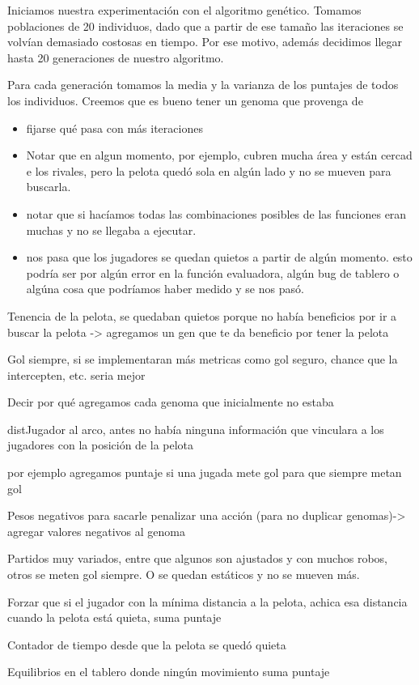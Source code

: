 Iniciamos nuestra experimentación con el algoritmo genético. Tomamos poblaciones de 20 individuos, dado que a partir de ese tamaño las iteraciones se volvían demasiado costosas en tiempo. Por ese motivo, además decidimos llegar hasta 20 generaciones de nuestro algoritmo.

Para cada generación tomamos la media y la varianza de los puntajes de todos los individuos. Creemos que es bueno tener un genoma que provenga de











\begin{itemize}
    \item fijarse qué pasa con más iteraciones
    \item Notar que en algun momento, por ejemplo, cubren mucha área y están cercad e los rivales, pero la pelota quedó sola en algún lado y no se mueven para buscarla.
    \item notar que si hacíamos todas las combinaciones posibles de las funciones eran muchas y no se llegaba a ejecutar.
    \item nos pasa que los jugadores se quedan quietos a partir de algún momento. esto podría ser por algún error en la función evaluadora, algún bug de tablero o algúna cosa que podríamos haber medido y se nos pasó.
\end{itemize}

Tenencia de la pelota, se quedaban quietos porque no había beneficios por ir a buscar la pelota -> agregamos un gen que te da beneficio por tener la pelota

Gol siempre, si se implementaran más metricas como gol seguro, chance que la intercepten, etc. seria mejor

Decir por qué agregamos cada genoma que inicialmente no estaba

distJugador al arco, antes no había ninguna información que vinculara a los jugadores con la posición de la pelota

por ejemplo agregamos puntaje si una jugada mete gol para que siempre metan gol

Pesos negativos para sacarle penalizar una acción (para no duplicar genomas)-> agregar valores negativos al genoma

Partidos muy variados, entre que algunos son ajustados y con muchos robos, otros se meten gol siempre. O se quedan estáticos y no se mueven más.

Forzar que si el jugador con la mínima distancia a la pelota, achica esa distancia cuando la pelota está quieta, suma puntaje

Contador de tiempo desde que la pelota se quedó quieta

Equilibrios en el tablero donde ningún movimiento suma puntaje


